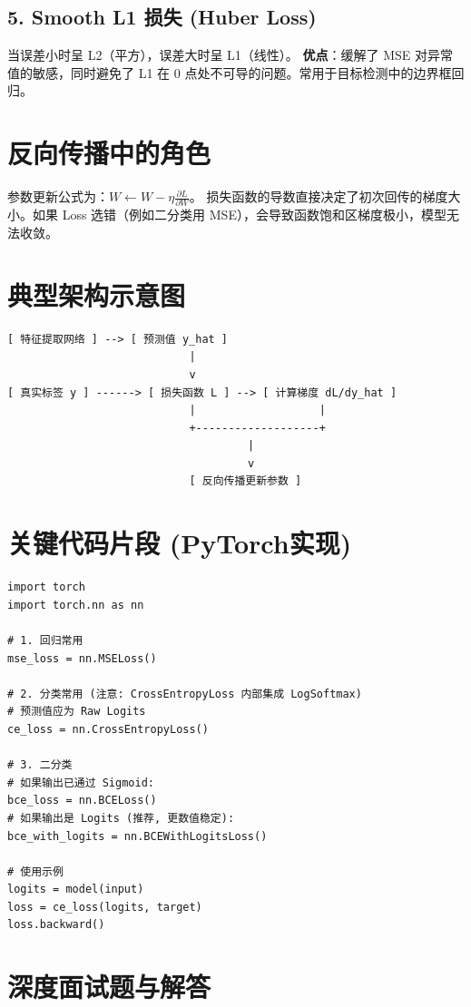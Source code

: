 \documentclass[12pt, a4paper]{book}
\begin{document}
\subsection{5. Smooth L1 损失 (Huber Loss)}
当误差小时呈 L2（平方），误差大时呈 L1（线性）。
\textbf{优点}：缓解了 MSE 对异常值的敏感，同时避免了 L1 在 0 点处不可导的问题。常用于目标检测中的边界框回归。

\section{反向传播中的角色}
参数更新公式为：$ W \leftarrow W - \eta \frac{\partial L}{\partial W} $。
损失函数的导数直接决定了初次回传的梯度大小。如果 Loss 选错（例如二分类用 MSE），会导致函数饱和区梯度极小，模型无法收敛。

\section{典型架构示意图}
\begin{verbatim}
[ 特征提取网络 ] --> [ 预测值 y_hat ] 
                            |
                            v
[ 真实标签 y ] ------> [ 损失函数 L ] --> [ 计算梯度 dL/dy_hat ]
                            |                   |
                            +-------------------+
                                     |
                                     v
                            [ 反向传播更新参数 ]
\end{verbatim}

\section{关键代码片段 (PyTorch实现)}
\begin{lstlisting}
import torch
import torch.nn as nn

# 1. 回归常用
mse_loss = nn.MSELoss()

# 2. 分类常用 (注意: CrossEntropyLoss 内部集成 LogSoftmax)
# 预测值应为 Raw Logits
ce_loss = nn.CrossEntropyLoss()

# 3. 二分类
# 如果输出已通过 Sigmoid:
bce_loss = nn.BCELoss()
# 如果输出是 Logits (推荐, 更数值稳定):
bce_with_logits = nn.BCEWithLogitsLoss()

# 使用示例
logits = model(input)
loss = ce_loss(logits, target)
loss.backward()
\end{lstlisting}

\section{深度面试题与解答}
\end{document}
